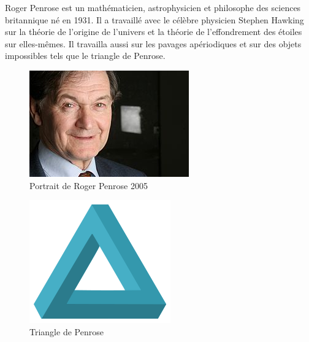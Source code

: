 \documentclass{article}
\begin{document}
\label{Penrose}

Roger Penrose est un mathématicien, astrophysicien et philosophe des sciences britannique né en 1931. Il a travaillé avec le célèbre physicien Stephen Hawking sur la théorie de l'origine de l'univers et la théorie de l'effondrement des étoiles sur elles-mêmes.
Il travailla aussi sur les pavages apériodiques et sur des objets impossibles tels que le triangle de Penrose.

\begin{figure} [!h]
    \center
    \includegraphics [scale=0.5] {image/Penrose.jpg}
    \caption{Portrait de Roger Penrose 2005}
\end{figure}

\begin{figure} [!h]
    \center
    \includegraphics [scale=0.5] {image/tri_penrose.png}
    \caption{Triangle de Penrose}
\end{figure}

%
\end{document}
